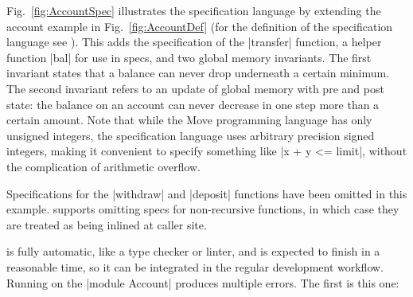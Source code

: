 Fig.~\ref{fig:AccountSpec} illustrates the specification language by extending
the account example in Fig.~\ref{fig:AccountDef} (for the definition of the
specification language see \cite{MOVE_SPEC_LANG_DEF}). This adds the
specification of the |transfer| function, a helper function |bal| for use in
specs, and two global memory invariants. The first invariant states that a
balance can never drop underneath a certain minimum. The second invariant refers
to an update of global memory with pre and post state: the balance on an account
can never decrease in one step more than a certain amount.  Note that while the
Move programming language has only unsigned integers, the specification language
uses arbitrary precision signed integers, making it convenient to specify
something like |x + y <= limit|, without the complication of arithmetic
overflow.

Specifications for the |withdraw| and |deposit| functions have been omitted in
this example.  \MVP supports omitting specs for non-recursive functions, in
which case they are treated as being inlined at caller site.




\label{sec:RunningProver}

\MVP is fully automatic, like a type checker or linter, and is
expected to finish in a reasonable time, so it can be integrated in
the regular development workflow. Running \MVP on the |module Account| produces
multiple errors. The first is this one:

